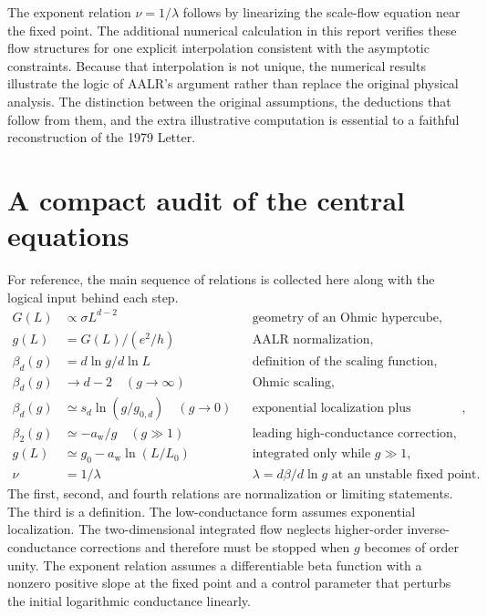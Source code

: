\documentclass[11pt,a4paper]{article}
\numberwithin{equation}{section}
\begin{document}
The exponent relation $\nu=1/\lambda$ follows by linearizing the scale-flow equation near the fixed point. The additional numerical calculation in this report verifies these flow structures for one explicit interpolation consistent with the asymptotic constraints. Because that interpolation is not unique, the numerical results illustrate the logic of AALR's argument rather than replace the original physical analysis. The distinction between the original assumptions, the deductions that follow from them, and the extra illustrative computation is essential to a faithful reconstruction of the 1979 Letter.

\appendix
\section{A compact audit of the central equations}

For reference, the main sequence of relations is collected here along with the logical input behind each step.
\begin{align*}
    G(L)&\propto\sigma L^{d-2}
    &&\text{geometry of an Ohmic hypercube},\\
    g(L)&=G(L)/(e^2/h)
    &&\text{AALR normalization},\\
    \beta_d(g)&=d\ln g/d\ln L
    &&\text{definition of the scaling function},\\
    \beta_d(g)&\to d-2\quad(g\to\infty)
    &&\text{Ohmic scaling},\\
    \beta_d(g)&\simeq s_d\ln(g/g_{0,d})\quad(g\to0)
    &&\text{exponential localization plus corrections},\\
    \beta_2(g)&\simeq-a_{\mathrm{w}}/g\quad(g\gg1)
    &&\text{leading high-conductance correction},\\
    g(L)&\simeq g_0-a_{\mathrm{w}}\ln(L/L_0)
    &&\text{integrated only while }g\gg1,\\
    \nu&=1/\lambda
    &&\lambda=d\beta/d\ln g\text{ at an unstable fixed point}.
\end{align*}
The first, second, and fourth relations are normalization or limiting statements. The third is a definition. The low-conductance form assumes exponential localization. The two-dimensional integrated flow neglects higher-order inverse-conductance corrections and therefore must be stopped when $g$ becomes of order unity. The exponent relation assumes a differentiable beta function with a nonzero positive slope at the fixed point and a control parameter that perturbs the initial logarithmic conductance linearly.
\end{document}
